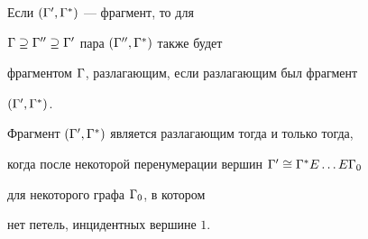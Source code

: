 \begin{note}


Если $({\Gamma}', {\Gamma}^*)$ --- фрагмент, то для 


${\Gamma}\supseteq {\Gamma}''\supseteq {\Gamma}'$ пара $({\Gamma}'', {\Gamma}^*)$ также будет 


фрагментом ${\Gamma}$, разлагающим, если разлагающим был фрагмент 


$({\Gamma}', {\Gamma}^*)$. 


\end{note}





\begin{lem}


Фрагмент $({\Gamma}', {\Gamma}^*)$ является разлагающим тогда и только тогда, 


когда после некоторой перенумерации вершин ${\Gamma}'\cong{\Gamma}^*E\dotsc E{\Gamma}_0$ 


для некоторого графа ${\Gamma}_0$, в котором 


нет петель, инцидентных вершине $1$. 


\end{lem}





